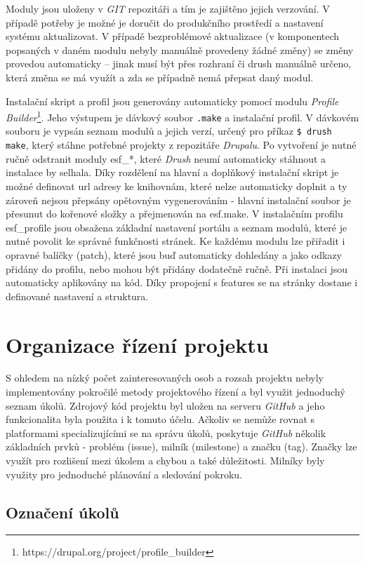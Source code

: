 Moduly jsou uloženy v \emph{GIT} repozitáři a tím je zajištěno jejich verzování. V případě potřeby je možné je doručit do produkčního prostředí a nastavení systému aktualizovat. V případě bezproblémové aktualizace (v komponentech popsaných v daném modulu nebyly manuálně provedeny žádné změny) se změny provedou automaticky – jinak musí být přes rozhraní či drush manuálně určeno, která změna se má využít a zda se případně nemá přepsat daný modul.

Instalační skript a profil jsou generovány automaticky pomocí modulu \emph{Profile Builder}\footnote{https://drupal.org/project/profile\_builder}. Jeho výstupem je dávkový soubor \texttt{.make} a instalační profil. V dávkovém souboru je vypsán seznam modulů a jejich verzí, určený pro příkaz \texttt{\$ drush make}, který stáhne potřebné projekty z repozitáře \emph{Drupalu}. Po vytvoření je nutné ručně odstranit moduly esf\_*, které \emph{Drush} neumí automaticky stáhnout a instalace by selhala. Díky rozdělení na hlavní a doplňkový instalační skript je možné definovat url adresy ke knihovnám, které nelze automaticky doplnit a ty zároveň nejsou přepsány opětovným vygenerováním - hlavní instalační soubor je přesunut do kořenové složky a přejmenován na esf.make. V instalačním profilu esf\_profile jsou obsažena základní nastavení portálu a seznam modulů, které je nutné povolit ke správné funkčnosti stránek. Ke každému modulu lze přiřadit i opravné balíčky (patch), které jsou buď automaticky dohledány a jako odkazy přidány do profilu, nebo mohou být přidány dodatečně ručně. Při instalaci jsou automaticky aplikovány na kód. Díky propojení s features se na stránky dostane i definované nastavení a struktura.

\section{Organizace řízení projektu}
S ohledem na nízký počet zainteresovaných osob a rozsah projektu nebyly implementovány pokročilé metody projektového řízení a byl využit jednoduchý seznam úkolů. Zdrojový kód projektu  byl uložen na serveru \emph{GitHub} a jeho funkcionalita byla použita i k tomuto účelu. Ačkoliv se nemůže rovnat s platformami specializujícími se na správu úkolů, poskytuje \emph{GitHub} několik základních prvků - problém (issue), milník (milestone) a značku (tag). Značky lze využít pro rozlišení mezi úkolem a chybou a také důležitosti. Milníky byly využity pro jednoduché plánování a sledování pokroku.

\subsection*{Označení úkolů}


